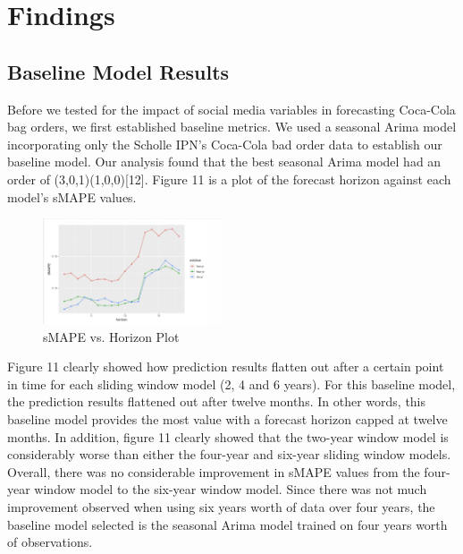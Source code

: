 \documentclass[12pt,oneside]{chicagocapstone}
\begin{document}
\hypertarget{findings}{%
\chapter*{Findings}\label{findings}}

\hypertarget{baseline-model-results}{%
\section*{Baseline Model Results}\label{baseline-model-results}}

Before we tested for the impact of social media variables in forecasting Coca-Cola bag orders, we first established baseline metrics. We used a seasonal Arima model incorporating only the Scholle IPN's Coca-Cola bad order data to establish our baseline model. Our analysis found that the best seasonal Arima model had an order of (3,0,1)(1,0,0){[}12{]}. Figure 11 is a plot of the forecast horizon against each model's sMAPE values.
\begin{figure}

{\centering \includegraphics[width=200px,angle = 0, scale=2.1]{figure/SMAPEvsHorizon} 

}

\caption{sMAPE vs. Horizon Plot}\label{fig:SMAPEvsHorizon}
\end{figure}
Figure 11 clearly showed how prediction results flatten out after a certain point in time for each sliding window model (2, 4 and 6 years). For this baseline model, the prediction results flattened out after twelve months. In other words, this baseline model provides the most value with a forecast horizon capped at twelve months. In addition, figure 11 clearly showed that the two-year window model is considerably worse than either the four-year and six-year sliding window models. Overall, there was no considerable improvement in sMAPE values from the four-year window model to the six-year window model. Since there was not much improvement observed when using six years worth of data over four years, the baseline model selected is the seasonal Arima model trained on four years worth of observations.
\end{document}
